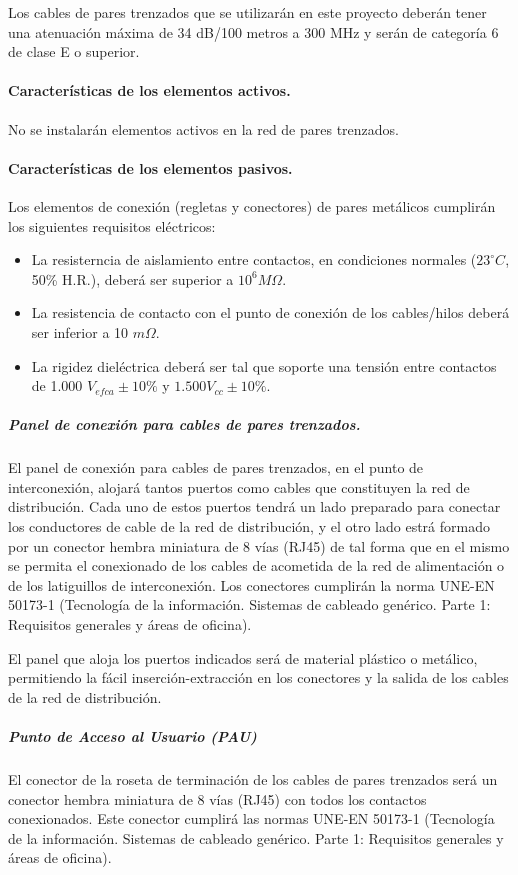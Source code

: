 Los cables de pares trenzados que se utilizarán en este proyecto deberán tener una atenuación máxima de 34 dB/100 metros a 300 MHz y serán de categoría 6 de clase E o superior.
\paragraph{Características de los elementos activos.}
No se instalarán elementos activos en la red de pares trenzados.
\paragraph{Características de los elementos pasivos.}
Los elementos de conexión (regletas y conectores) de pares metálicos cumplirán los siguientes requisitos eléctricos:
\begin{itemize}
	\item La resisterncia de aislamiento entre contactos, en condiciones normales ($23^{\circ}C$, 50\% H.R.), deberá ser superior a $10^{6} M\Omega.$ 
	\item La resistencia de contacto con el punto de conexión de los cables/hilos deberá ser inferior a 10 $m\Omega.$ 
	\item La rigidez dieléctrica deberá ser tal que soporte una tensión entre contactos de 1.000 $V_{efca}\pm10\%$ y $1.500 V_{cc}\pm10\%$.
\end{itemize}

\subparagraph{Panel de conexión para cables de pares trenzados.}
El panel de conexión para cables de pares trenzados, en el punto de interconexión, alojará tantos puertos como cables que constituyen la red de distribución. Cada uno de estos puertos tendrá un lado preparado para conectar los conductores de cable de la red de distribución, y el otro lado estrá formado por un conector hembra miniatura de 8 vías (RJ45) de tal forma que en el mismo se permita el conexionado de los cables de acometida de la red de alimentación o de los latiguillos de interconexión. Los conectores cumplirán la norma UNE-EN 50173-1 (Tecnología de la información. Sistemas de cableado genérico. Parte 1: Requisitos generales y áreas de oficina).

El panel que aloja los puertos indicados será de material plástico o metálico, permitiendo la fácil inserción-extracción en los conectores y la salida de los cables de la red de distribución.

\subparagraph{Punto de Acceso al Usuario (PAU)}
El conector de la roseta de terminación de los cables de pares trenzados será un conector hembra miniatura de 8 vías (RJ45) con todos los contactos conexionados. Este conector cumplirá las normas UNE-EN 50173-1 (Tecnología de la información. Sistemas de cableado genérico. Parte 1: Requisitos generales y áreas de oficina).

